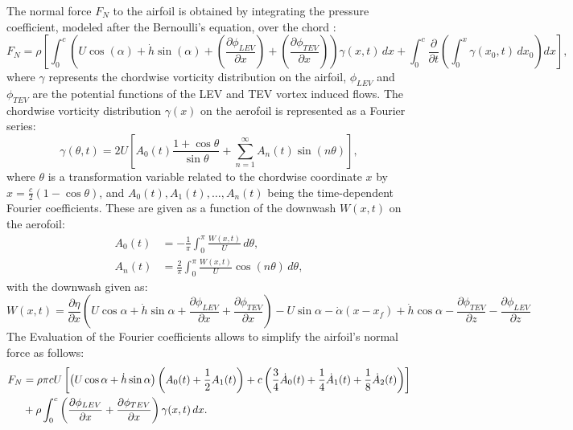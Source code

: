 \documentclass[a4paper,12pt]{article}
\begin{document}
The normal force $F_N$ to the airfoil is obtained by integrating the pressure coefficient, modeled after the Bernoulli’s equation, over the chord \citep{ramesh2014discrete}:
\begin{equation}
    F_N = \rho \left[ \int_0^c \left( U \cos(\alpha) + \dot{h} \sin(\alpha) + \left( \frac{\partial \phi_{LEV}}{\partial x} \right) + \left( \frac{\partial \phi_{TEV}}{\partial x} \right) \right) \gamma(x, t) \, dx
    + \int_0^c \frac{\partial}{\partial t} \left( \int_0^x \gamma(x_0, t) \, dx_0 \right) dx \right],
    \label{eq:FN_integral}
\end{equation}
where $\gamma$ represents the chordwise vorticity distribution on the airfoil, $\phi_{LEV}$ and $\phi_{TEV}$ are the potential functions of the LEV and TEV vortex induced flows. The chordwise vorticity distribution $\gamma(x)$ on the aerofoil is represented as a Fourier series:
\begin{equation}
    \gamma(\theta, t) = 2U \left[ A_0(t) \frac{1 + \cos\theta}{\sin\theta} + \sum_{n=1}^{\infty} A_n(t) \sin(n\theta) \right],
    \label{eq:gamma_fourier}
\end{equation}
where $\theta$ is a transformation variable related to the chordwise coordinate $x$ by $x = \frac{c}{2} (1 - \cos\theta)$, and $A_0(t), A_1(t), \ldots, A_n(t)$ being the time-dependent Fourier coefficients.
These are given as a function of the downwash $W(x, t)$ on the aerofoil:
\begin{align}
    A_0(t) &= -\frac{1}{\pi} \int_0^{\pi} \frac{W(x, t)}{U} \, d\theta, \label{eq:A0}\\
    A_n(t) &= \frac{2}{\pi} \int_0^{\pi} \frac{W(x, t)}{U} \cos(n\theta) \, d\theta, \label{eq:An}
\end{align}
with the downwash given as:
\begin{equation}
    W(x, t) = \frac{\partial \eta}{\partial x} \left( U \cos\alpha + \dot{h} \sin\alpha + \frac{\partial \phi_{LEV}}{\partial x} + \frac{\partial \phi_{TEV}}{\partial x} \right)
    - U \sin\alpha - \dot{\alpha} (x - x_f) + \dot{h} \cos\alpha - \frac{\partial \phi_{TEV}}{\partial z} - \frac{\partial \phi_{LEV}}{\partial z}
    \label{eq:W}
\end{equation}
The Evaluation of the Fourier coefficients allows to simplify the airfoil's normal force as follows:
\begin{align}
    F_N &= \rho \pi c U \left[ \left( U \cos\alpha + \dot{h} \sin\alpha \right) \left( A_0(t) + \frac{1}{2}A_1(t) \right)
    + c \left( \frac{3}{4} \dot{A}_0(t) + \frac{1}{4} \dot{A}_1(t) + \frac{1}{8} \dot{A}_2(t) \right) \right]\notag \\
    &+ \rho \int_0^c \left( \frac{\partial \phi_{LEV}}{\partial x} + \frac{\partial \phi_{TEV}}{\partial x} \right) \gamma(x, t) \, dx.
    \label{eq:FN_fourier}
\end{align}
\end{document}
